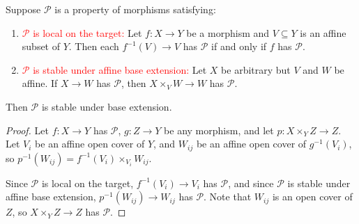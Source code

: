 \begin{proposition*}\label{affinebaseext}
	Suppose $\mathcal{P}$ is a property of morphisms satisfying:
	\begin{enumerate}[label=\textup{(\arabic*)}]
		\item \textcolor{red}{$\mathcal{P}$ is local on the target:} Let $f:X\rightarrow Y$ be a morphism and $V\subseteq Y$ is an affine subset of $Y$. Then each $f^{-1}(V)\rightarrow V$ has $\mathcal{P}$ if and only if $f$ has $\mathcal{P}$.
		\item \textcolor{red}{$\mathcal{P}$ is stable under affine base extension:} Let $X$ be arbitrary but $V$ and $W$ be affine. If $X\rightarrow W$ has $\mathcal{P}$, then $X\times_VW\rightarrow W$ has $\mathcal{P}$.
	\end{enumerate}
	Then $\mathcal{P}$ is stable under base extension.
	\begin{proof}
		Let $f:X\rightarrow Y$ has $\mathcal{P}$, $g:Z\rightarrow Y$ be any morphism, and let $p:X\times_YZ\rightarrow Z$. Let $V_i$ be an affine open cover of $Y$, and $W_{ij}$ be an affine open cover of $g^{-1}\!\left(V_i\right)$, so $p^{-1}\!\left(W_{ij}\right)=f^{-1}\!\left(V_i\right)\times_{V_i}W_{ij}$.
		
		Since $\mathcal{P}$ is local on the target, $f^{-1}\!\left(V_i\right)\rightarrow V_i$ has $\mathcal{P}$, and since $\mathcal{P}$ is stable under affine base extension, $p^{-1}\!\left(W_{ij}\right)\rightarrow W_{ij}$ has $\mathcal{P}$. Note that $W_{ij}$ is an open cover of $Z$, so $X\times_YZ\rightarrow Z$ has $\mathcal{P}$.
	\end{proof}
\end{proposition*}



